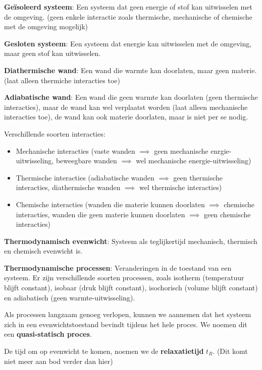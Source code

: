 \begin{definition}
    \textbf{Geïsoleerd systeem}: Een systeem dat geen energie of stof kan uitwisselen met de omgeving. (geen enkele interactie zoals thermische, mechanische of chemische met de omgeving mogelijk)
\end{definition}

\begin{definition}
    \textbf{Gesloten systeem}: Een systeem dat energie kan uitwisselen met de omgeving, maar geen stof kan uitwisselen.
\end{definition}

\begin{definition}
    \textbf{Diathermische wand}: Een wand die warmte kan doorlaten, maar geen materie. (laat alleen thermiche interacties toe)
\end{definition}

\begin{definition}
    \textbf{Adiabatische wand}: Een wand die geen warmte kan doorlaten (geen thermische interacties), maar de wand kan wel verplaatst worden (laat alleen mechanische interacties toe), de wand kan ook materie doorlaten, maar is niet per se nodig.
\end{definition}

Verschillende soorten interacties:
\begin{itemize}
    \item Mechanische interacties (vaste wanden \(\implies\) geen mechanische enrgie-uitwisseling, beweegbare wanden \(\implies\) wel mechanische energie-uitwisseling)
    \item Thermische interacties (adiabatische wanden \(\implies\) geen thermische interacties, diathermische wanden \(\implies\) wel thermische interacties)
    \item Chemische interacties (wanden die materie kunnen doorlaten \(\implies\) chemische interacties, wanden die geen materie kunnen doorlaten \(\implies\) geen chemische interacties)
\end{itemize}

\begin{definition}
    \textbf{Thermodynamisch evenwicht}: Systeem  als teglijkertijd mechanisch, thermisch en chemisch evenwicht is.
\end{definition}

\begin{definition}
  \textbf{Thermodynamische processen}: Veranderingen in de toestand van een systeem. Er zijn verschillende soorten processen, zoals isotherm (temperatuur blijft constant), isobaar (druk blijft constant), isochorisch (volume blijft constant) en adiabatisch (geen warmte-uitwisseling).  
\end{definition}

Als processen langzaam genoeg verlopen, kunnen we aannemen dat het systeem zich in een evenwichtstoestand bevindt tijdens het hele proces. We noemen dit een \textbf{quasi-statisch proces}.

De tijd om op evenwicht te komen, noemen we de \textbf{relaxatietijd} \(t_R\). (Dit komt niet meer aan bod verder dan hier)


